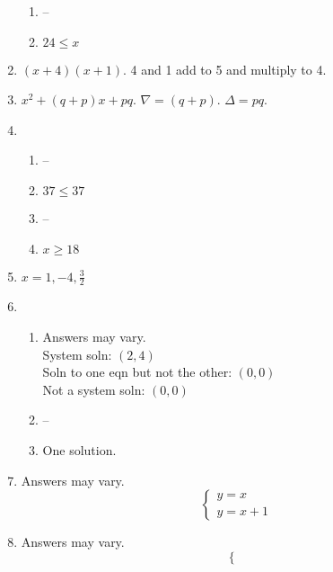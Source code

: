 \documentclass{article}
\begin{document}
\begin{enumerate}
\begin{enumerate}
	\item --
	
	\item $24 \leq x$
	
	\end{enumerate}
	
\item $(x + 4)(x + 1)$. 4 and 1 add to 5 and multiply to 4.

\item $x^2 + (q + p)x + pq$. $\nabla = (q + p)$. $\Delta = pq$.

\item

	\begin{enumerate}
	
	\item --
	
	\item $37 \leq 37$
	
	\item --
	
	\item $x \geq 18$
	
	\end{enumerate}
	
\item $x = 1, -4, \frac{3}{2}$

\item

	\begin{enumerate}
	
	\item Answers may vary. \\ System soln: $(2, 4)$ \\ Soln to one eqn but not the other: $(0, 0)$ \\ Not a system soln: $(0, 0)$
	
	\item --
	
	\item One solution.
	
	\end{enumerate}
	
\item Answers may vary.
	\begin{equation*}
		\begin{cases}
		 y = x \\
		 y = x + 1
		\end{cases}
	\end{equation*}
	
\item Answers may vary.
	\begin{equation*}
		\begin{cases}
		
		\end{cases}
	\end{equation*}

\end{enumerate}
\end{document}
